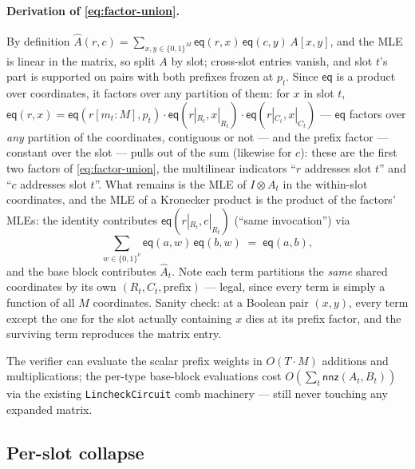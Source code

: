 \documentclass[11pt]{article}
\newcommand{\eq}{\mathsf{eq}}
\newcommand{\nnz}{\mathsf{nnz}}
\newcommand{\code}[1]{\texttt{#1}}
\theoremstyle{definition}
\begin{document}
\paragraph{Derivation of \eqref{eq:factor-union}.} By definition
$\hat A(r,c) = \sum_{x,y \in \{0,1\}^M} \eq(r,x)\,\eq(c,y)\,A[x,y]$, and
the MLE is linear in the matrix, so split $A$ by slot; cross-slot entries
vanish, and slot $t$'s part is supported on pairs with both prefixes frozen
at $p_t$. Since $\eq$ is a product over coordinates, it factors over any
partition of them: for $x$ in slot $t$,
$\eq(r,x) = \eq(r[m_t{:}M], p_t)\cdot\eq(r|_{R_t}, x|_{R_t})
\cdot\eq(r|_{C_t}, x|_{C_t})$ --- $\eq$ factors over \emph{any} partition
of the coordinates, contiguous or not --- and the prefix factor ---
constant over the slot --- pulls out of the sum (likewise for $c$): these
are the first two factors of \eqref{eq:factor-union}, the multilinear
indicators ``$r$ addresses slot $t$'' and ``$c$ addresses slot $t$''. What
remains is the MLE of $I \otimes A_t$ in the within-slot coordinates, and
the MLE of a Kronecker product is the product of the factors' MLEs: the
identity contributes $\eq(r|_{R_t}, c|_{R_t})$
(``same invocation'') via
\begin{equation*}
  \sum_{w \in \{0,1\}^{\nu}} \eq(a, w)\,\eq(b, w) \;=\; \eq(a, b),
\end{equation*}
and the base block contributes $\hat A_t$. Note each term partitions the
\emph{same} shared coordinates by its own $(R_t, C_t, \text{prefix})$ ---
legal, since every term is simply a function of all $M$ coordinates.
Sanity check: at a Boolean pair $(x, y)$, every term except the one for
the slot actually containing $x$ dies at its prefix factor, and the
surviving term reproduces the matrix entry.

The verifier can evaluate the scalar prefix weights in $O(T \cdot M)$
additions and multiplications; the per-type base-block evaluations cost
$O(\sum_t \nnz(A_t, B_t))$ via the existing \code{LincheckCircuit} comb
machinery --- still never touching any expanded matrix.

\subsection{Per-slot collapse}
\end{document}
